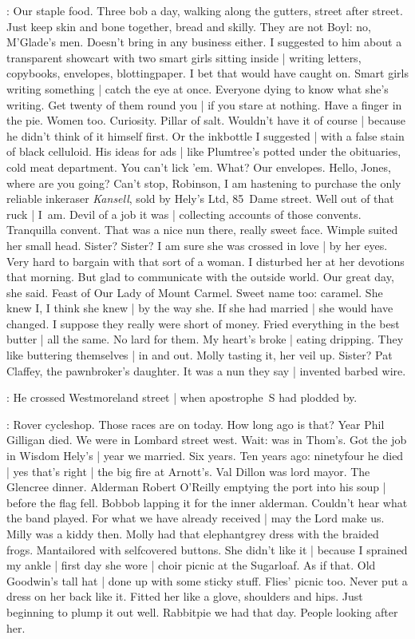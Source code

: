 \BloomInt:
Our staple food.
Three bob a day,
walking along the gutters,
street after street.
Just keep skin and bone together,
bread and skilly.
They are not Boyl:
no, M'Glade's men.
Doesn't bring in any business either.
I suggested to him about a transparent showcart
with two smart girls sitting inside |
writing letters, copybooks, envelopes, blottingpaper.
I bet that would have caught on.
Smart girls writing something |
catch the eye at once.
Everyone dying to know what she's writing.
Get twenty of them round you |
if you stare at nothing.
Have a finger in the pie.
Women too.
Curiosity.
Pillar of salt.
Wouldn't have it of course |
because he didn't think of it himself first.
Or the inkbottle I suggested |
with a false stain of black celluloid.
His ideas for ads |
like Plumtree's potted under the obituaries,
cold meat department.
You can't lick 'em.
What?
Our envelopes.
Hello, Jones, where are you going?
Can't stop, Robinson,
I am hastening to purchase the only reliable inkeraser \emph{Kansell},
sold by Hely's Ltd,
85~Dame street.
Well out of that ruck |
I~am.
Devil of a job it was |
collecting accounts of those convents.
Tranquilla convent.
That was a nice nun there,
really sweet face.
Wimple suited her small head.
Sister?
Sister?
I am sure she was crossed in love |
by her eyes.
Very hard to bargain with that sort of a woman.
I disturbed her at her devotions that morning.
But glad to communicate with the outside world.
Our great day,
she said.
Feast of Our Lady of Mount Carmel.
Sweet name too:
caramel.
She knew I,
I think she knew |
by the way she.
If she had married |
she would have changed.
I suppose they really were short of money.
Fried everything in the best butter |
all the same.
No lard for them.
My heart's broke |
eating dripping.
They like buttering themselves |
in and out.
Molly tasting it,
her veil up.
Sister?
Pat Claffey,
the pawnbroker's daughter.
It was a nun they say |
invented barbed wire.

:
He crossed Westmoreland street |
when apostrophe~S had plodded by.

\BloomInt:
Rover cycleshop.
Those races are on today.
How long ago is that?
Year Phil Gilligan died.
We were in Lombard street west.
Wait:
was in Thom's.
Got the job in Wisdom Hely's |
year we married.
Six years.
Ten years ago:
ninetyfour he died |
yes that's right |
the big fire at Arnott's.
Val Dillon was lord mayor.
The Glencree dinner.
Alderman Robert O'Reilly emptying the port into his soup |
before the flag fell.
Bobbob lapping it for the inner alderman.
Couldn't hear what the band played.
For what we have already received |
may the Lord make us.
Milly was a kiddy then.
Molly had that elephantgrey dress with the braided frogs.
Mantailored with selfcovered buttons.
She didn't like it |
because I sprained my ankle |
first day she wore |
choir picnic at the Sugarloaf.
As if that.
Old Goodwin's tall hat |
done up with some sticky stuff.
Flies' picnic too.
Never put a dress on her back like it.
Fitted her like a glove,
shoulders and hips.
Just beginning to plump it out well.
Rabbitpie we had that day.
People looking after her.


